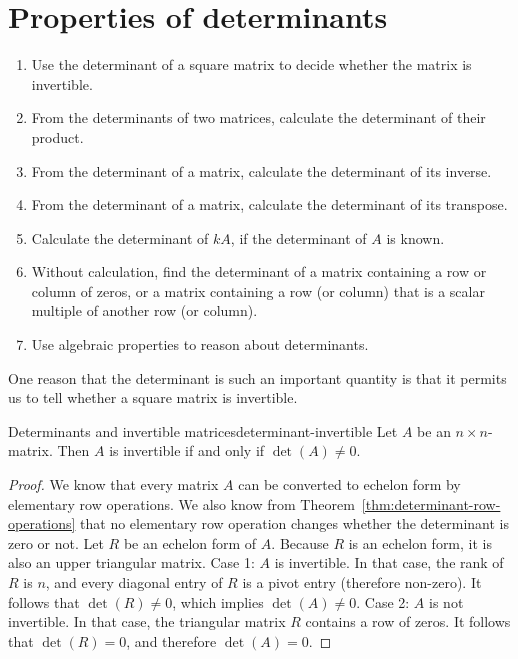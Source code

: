 \section{Properties of determinants}

\begin{outcome}
  \begin{enumerate}
  \item Use the determinant of a square matrix to decide whether the
    matrix is invertible.
  \item From the determinants of two matrices, calculate the
    determinant of their product. 
  \item From the determinant of a matrix, calculate the determinant of
    its inverse.
  \item From the determinant of a matrix, calculate the determinant of
    its transpose.
  \item Calculate the determinant of $kA$, if the determinant of $A$
    is known.
  \item Without calculation, find the determinant of a matrix
    containing a row or column of zeros, or a matrix containing a row
    (or column) that is a scalar multiple of another row (or column).
  \item Use algebraic properties to reason about determinants.
  \end{enumerate}
\end{outcome}

One reason that the determinant is such an important quantity is that
it permits us to tell whether a square matrix is invertible.

\begin{theorem}{Determinants and invertible matrices}{determinant-invertible}
  Let $A$ be an $n\times n$-matrix. Then $A$ is invertible%
   if and
  only if $\det(A) \neq 0$.
\end{theorem}

\begin{proof}
  We know that every matrix $A$ can be converted to echelon form by
  elementary row operations. We also know from
  Theorem~\ref{thm:determinant-row-operations} that no elementary row
  operation changes whether the determinant is zero or not.  Let $R$
  be an echelon form of $A$. Because $R$ is an echelon form, it is
  also an upper triangular matrix. Case 1: $A$ is invertible. In that
  case, the rank of $R$ is $n$, and every diagonal entry of $R$ is a
  pivot entry (therefore non-zero). It follows that $\det(R)\neq 0$,
  which implies $\det(A)\neq 0$. Case 2: $A$ is not invertible. In
  that case, the triangular matrix $R$ contains a row of zeros. It
  follows that $\det(R)=0$, and therefore $\det(A)=0$.
\end{proof}


